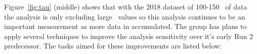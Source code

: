Figure~\ref{fig:tau} (middle) shows that with the 2018 dataset of 100-150 \invfb\ of data the analysis is only excluding large \tanb\ values so this analysis continues to be an important measurement as more data in accumulated.
The group has plans to apply several techniques to improve the analysis sensitivity over it's early Run 2 predecessor.  The tasks aimed for these improvements are listed below:




